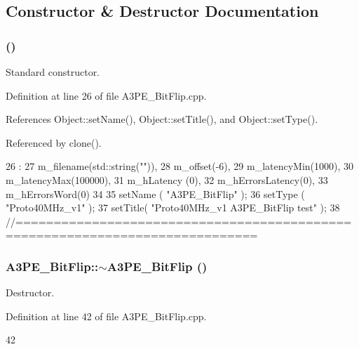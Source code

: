 \subsection{Constructor \& Destructor Documentation}
\hypertarget{classA3PE__BitFlip_a79aca0cefbd433bfb7f0e0cb6bc7abe1}{
\subsubsection[{A3PE\_\-BitFlip}]{ ()}}
\label{classA3PE__BitFlip_a79aca0cefbd433bfb7f0e0cb6bc7abe1}


Standard constructor. 

Definition at line 26 of file A3PE\_\-BitFlip.cpp.

References Object::setName(), Object::setTitle(), and Object::setType().

Referenced by clone().


\begin{DoxyCode}
26                              :
27   m_filename(std::string("")),
28   m_offset(-6),
29   m_latencyMin(1000),
30   m_latencyMax(100000),
31   m_hLatency (0),
32   m_hErrorsLatency(0),
33   m_hErrorsWord(0)
34 {
35   setName ( "A3PE_BitFlip" );
36   setType ( "Proto40MHz_v1" );
37   setTitle( "Proto40MHz_v1 A3PE_BitFlip test" );
38 }
//=============================================================================
\end{DoxyCode}
\hypertarget{classA3PE__BitFlip_ab58f69a2c8d342bcad937b1dbc0bb3ed}{
\subsubsection[{$\sim$A3PE\_\-BitFlip}]{\setlength{\rightskip}{0pt plus 5cm}A3PE\_\-BitFlip::$\sim$A3PE\_\-BitFlip ()}}
\label{classA3PE__BitFlip_ab58f69a2c8d342bcad937b1dbc0bb3ed}


Destructor. 

Definition at line 42 of file A3PE\_\-BitFlip.cpp.


\begin{DoxyCode}
42 {}
\end{DoxyCode}



